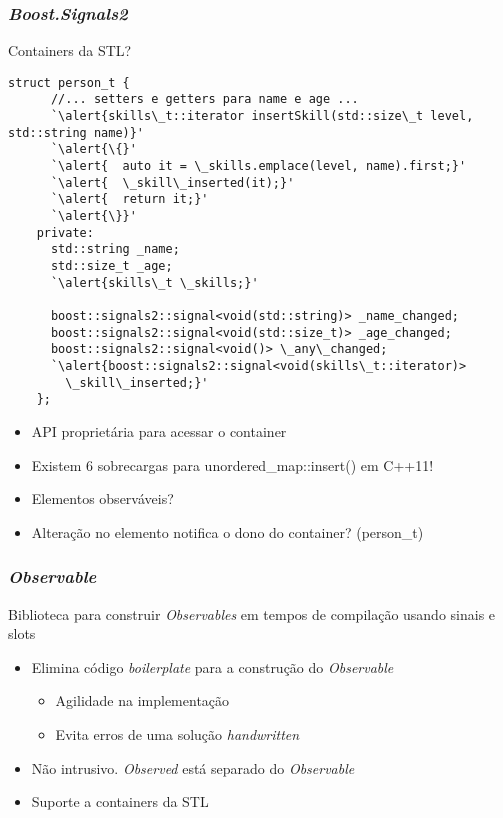 \documentclass[t]{beamer}
\begin{document}
\begin{frame}[fragile]
  \frametitle{\textit{Boost.Signals2}}
  Containers da STL?

  \begin{lstlisting}[basicstyle=\tiny,escapeinside=`']
    struct person_t {
      //... setters e getters para name e age ...      
      `\alert{skills\_t::iterator insertSkill(std::size\_t level, std::string name)}'
      `\alert{\{}'
      `\alert{  auto it = \_skills.emplace(level, name).first;}'
      `\alert{  \_skill\_inserted(it);}'
      `\alert{  return it;}'
      `\alert{\}}'
    private:    
      std::string _name;
      std::size_t _age;
      `\alert{skills\_t \_skills;}'

      boost::signals2::signal<void(std::string)> _name_changed;
      boost::signals2::signal<void(std::size_t)> _age_changed;
      boost::signals2::signal<void()> \_any\_changed;
      `\alert{boost::signals2::signal<void(skills\_t::iterator)> 
        \_skill\_inserted;}'
    };
  \end{lstlisting}

  \begin{itemize}
    \item<2->{API proprietária para acessar o container}
    \item<3->{Existem 6 sobrecargas para unordered\_map::insert() em C++11!}
    \item<4->{Elementos observáveis?}
    \item<5->{Alteração no elemento notifica o dono do container? (person\_t)}
  \end{itemize}
\end{frame}

\begin{frame}[fragile]
  \frametitle{\textit{Observable}}
  Biblioteca para construir \textit{Observables} em tempos de compilação usando sinais e slots
  \begin{itemize}
  \item<2->{Elimina código \textit{boilerplate} para a construção do \textit{Observable}}
    \begin{itemize}
    \item<3->{Agilidade na implementação}
    \item<4->{Evita erros de uma solução \textit{handwritten}}
    \end{itemize}
  \item<5->{Não intrusivo. \textit{Observed} está separado do \textit{Observable}}
  \item<6->{Suporte a containers da STL}
  \end{itemize}
\end{frame}
\end{document}
